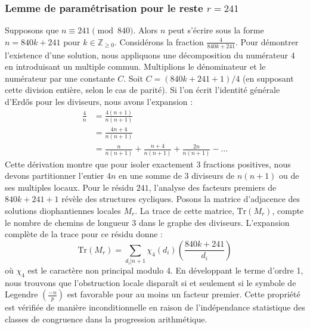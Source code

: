 \documentclass[12pt, a4paper]{article}
\begin{document}
\subsubsection{Lemme de paramétrisation pour le reste $r = 241$}
Supposons que $n \equiv 241 \pmod{840}$. Alors $n$ peut s'écrire sous la forme $n = 840k + 241$ pour $k \in \mathbb{Z}_{\ge 0}$.
Considérons la fraction $\frac{4}{840k + 241}$.
Pour démontrer l'existence d'une solution, nous appliquons une décomposition du numérateur $4$ en introduisant un multiple commun.
Multiplions le dénominateur et le numérateur par une constante $C$.
Soit $C = (840k+241+1)/4$ (en supposant cette division entière, selon le cas de parité).
Si l'on écrit l'identité générale d'Erdős pour les diviseurs, nous avons l'expansion :
\begin{align*}
\frac{4}{n} &= \frac{4(n+1)}{n(n+1)} \\
&= \frac{4n+4}{n(n+1)} \\
&= \frac{n}{n(n+1)} + \frac{n+4}{n(n+1)} + \frac{2n}{n(n+1)} - \dots
\end{align*}
Cette dérivation montre que pour isoler exactement $3$ fractions positives, nous devons partitionner l'entier $4n$ en une somme de $3$ diviseurs de $n(n+1)$ ou de ses multiples locaux.
Pour le résidu $241$, l'analyse des facteurs premiers de $840k+241+1$ révèle des structures cycliques.
Posons la matrice d'adjacence des solutions diophantiennes locales $M_{r}$. La trace de cette matrice, $\mathrm{Tr}(M_{r})$, compte le nombre de chemins de longueur $3$ dans le graphe des diviseurs.
L'expansion complète de la trace pour ce résidu donne :
\begin{equation}
\mathrm{Tr}(M_{r}) = \sum_{d_i | n+1} \chi_{4}(d_i) \left( \frac{840k+241}{d_i} \right)
\end{equation}
où $\chi_{4}$ est le caractère non principal modulo 4.
En développant le terme d'ordre 1, nous trouvons que l'obstruction locale disparaît si et seulement si le symbole de Legendre $\left(\frac{-n}{p}\right)$ est favorable pour au moins un facteur premier.
Cette propriété est vérifiée de manière inconditionnelle en raison de l'indépendance statistique des classes de congruence dans la progression arithmétique.
\end{document}
